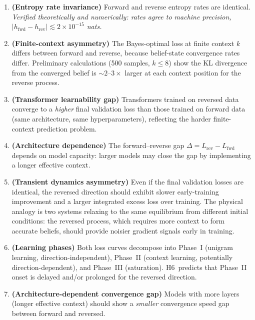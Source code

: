 \documentclass[11pt]{article}
\begin{document}
\begin{enumerate}
  \item[\textbf{H1}] \textbf{(Entropy rate invariance)} Forward and reverse entropy rates are identical.  \emph{Verified theoretically and numerically: rates agree to machine precision, $|h_{\mathrm{fwd}} - h_{\mathrm{rev}}| \lesssim 2\times10^{-15}$ nats.}

  \item[\textbf{H2}] \textbf{(Finite-context asymmetry)} The Bayes-optimal loss at finite context $k$ differs between forward and reverse, because belief-state convergence rates differ.  Preliminary calculations (500 samples, $k \le 8$) show the KL divergence from the converged belief is $\sim2$--$3\times$ larger at each context position for the reverse process.

  \item[\textbf{H3}] \textbf{(Transformer learnability gap)} Transformers trained on reversed data converge to a \emph{higher} final validation loss than those trained on forward data (same architecture, same hyperparameters), reflecting the harder finite-context prediction problem.

  \item[\textbf{H4}] \textbf{(Architecture dependence)} The forward--reverse gap $\Delta = L_{\mathrm{rev}} - L_{\mathrm{fwd}}$ depends on model capacity: larger models may close the gap by implementing a longer effective context.

  \item[\textbf{H5}] \textbf{(Transient dynamics asymmetry)} Even if the final validation losses are identical, the reversed direction should exhibit slower early-training improvement and a larger integrated excess loss over training.  The physical analogy is two systems relaxing to the same equilibrium from different initial conditions: the reversed process, which requires more context to form accurate beliefs, should provide noisier gradient signals early in training.

  \item[\textbf{H6}] \textbf{(Learning phases)} Both loss curves decompose into Phase~I (unigram learning, direction-independent), Phase~II (context learning, potentially direction-dependent), and Phase~III (saturation).  H6~predicts that Phase~II onset is delayed and/or prolonged for the reversed direction.

  \item[\textbf{H7}] \textbf{(Architecture-dependent convergence gap)} Models with more layers (longer effective context) should show a \emph{smaller} convergence speed gap between forward and reversed.
\end{enumerate}
\end{document}
